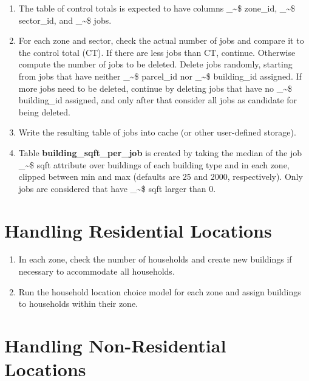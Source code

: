 \documentclass[11pt]{article}
\makeatletter
\newcommand\code{\bgroup\@makeother\_\@makeother\~\@makeother\$\@codex}
\def\@codex#1{{\normalfont\ttfamily\hyphenchar\font=-1 #1}\egroup}
\makeatother
\begin{document}
\begin{enumerate}
\item The table of control totals is expected to have columns \code{zone_id}, \code{sector_id}, and \code{jobs}.
\item For each zone and sector, check the actual number of jobs and compare it to the control total (CT). If there are less jobs than CT, continue. Otherwise compute the number of jobs to be deleted. Delete jobs randomly, starting from jobs  that have neither \code{parcel_id} nor \code{building_id} assigned. If more jobs need to be deleted, continue by deleting jobs that have no  \code{building_id} assigned, and only after that consider all jobs as candidate for  being deleted.
\item Write the resulting table of jobs into cache (or other user-defined storage).
\item Table {\bf building\_sqft\_per\_job} is created by taking the median of the job \code{sqft} attribute over buildings of each building type and in each zone, clipped between min and max (defaults are 25 and 2000, respectively). Only jobs are considered that have \code{sqft} larger than 0.
\end{enumerate}

\section{Handling Residential Locations}
%
\begin{enumerate}
\item In each zone, check the number of households and create new buildings if necessary to accommodate all households.
\item Run the household location choice model for each zone and assign buildings to households within their zone.
\end{enumerate}

\section{Handling Non-Residential Locations}
%
\end{document}
